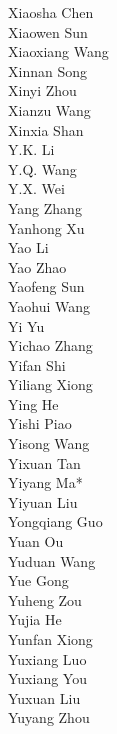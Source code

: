\documentclass[11pt, a4paper, logo, copyright, nonumbering]{deepseek}
\begin{document}
{\begin{multicols}{2}
\color{damaiblue} Xiaosha Chen \\
\color{damaiblue} Xiaowen Sun \\
\color{damaiblue} Xiaoxiang Wang \\
\color{damaiblue} Xinnan Song \\
\color{damaiblue} Xinyi Zhou \\
\color{damaiblue} Xianzu Wang \\
\color{damaiblue} Xinxia Shan \\
\color{damaiblue} Y.K. Li \\
\color{damaiblue} Y.Q. Wang \\
\color{damaiblue} Y.X. Wei \\
\color{damaiblue} Yang Zhang \\
\color{damaiblue} Yanhong Xu \\
\color{damaiblue} Yao Li \\
\color{damaiblue} Yao Zhao \\
\color{damaiblue} Yaofeng Sun \\
\color{damaiblue} Yaohui Wang \\
\color{damaiblue} Yi Yu \\
\color{damaiblue} Yichao Zhang \\
\color{damaiblue} Yifan Shi \\
\color{damaiblue} Yiliang Xiong \\
\color{damaiblue} Ying He \\
\color{damaiblue} Yishi Piao \\
\color{damaiblue} Yisong Wang \\
\color{damaiblue} Yixuan Tan \\
\color{damaiblue} Yiyang Ma* \\
\color{damaiblue} Yiyuan Liu \\
\color{damaiblue} Yongqiang Guo \\
\color{damaiblue} Yuan Ou \\
\color{damaiblue} Yuduan Wang \\
\color{damaiblue} Yue Gong \\
\color{damaiblue} Yuheng Zou \\
\color{damaiblue} Yujia He \\
\color{damaiblue} Yunfan Xiong \\
\color{damaiblue} Yuxiang Luo \\
\color{damaiblue} Yuxiang You \\
\color{damaiblue} Yuxuan Liu \\
\color{damaiblue} Yuyang Zhou \\

\end{multicols}}
\end{document}
